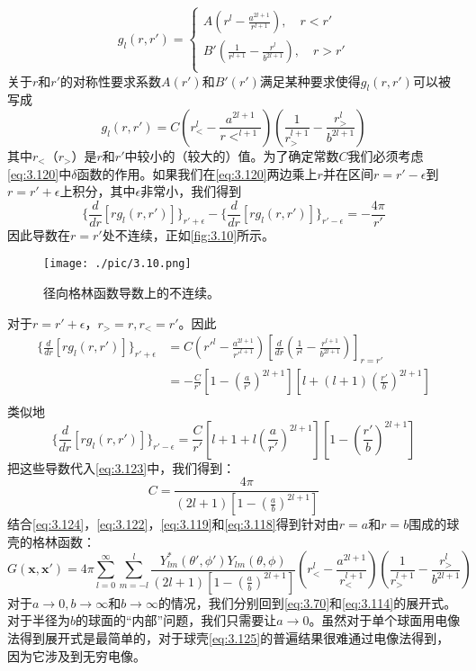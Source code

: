 \documentclass[12pt]{book}
\numberwithin{equation}{chapter}
\numberwithin{figure}{chapter}
\numberwithin{footnote}{page}
\begin{document}
\begin{equation}\label{eq:3.121}
    g_l(r,r')=
    \begin{cases}
        A(r^l-\frac{a^{2l+1}}{r^{l+1}}),\quad r<r'\\
        B'(\frac{1}{r^{l+1}}-\frac{r^l}{b^{2l+1}}),\quad r>r'\\
    \end{cases}
\end{equation}
关于$r$和$r'$的对称性要求系数$A(r')$和$B'(r')$满足某种要求使得$g_l(r,r')$可以被写成
\begin{equation}\label{eq:3.122}
    g_l(r,r')=C(r_<^l-\frac{a^{2l+1}}{r<^{l+1}})(\frac{1}{r_>^{l+1}}-\frac{r_>^l}{b^{2l+1}})
\end{equation}
其中$r_<$（$r_>$）是$r$和$r'$中较小的（较大的）值。为了确定常数$C$我们必须考虑\autoref{eq:3.120}中$\delta$函数的作用。如果我们在\autoref{eq:3.120}两边乘上$r$并在区间$r=r'-\epsilon$到$r=r'+\epsilon$上积分，其中$\epsilon$非常小，我们得到
\begin{equation}\label{eq:3.123}
    \{\frac{d}{dr}[rg_l(r,r')]\}_{r'+\epsilon}-\{\frac{d}{dr}[rg_l(r,r')]\}_{r'-\epsilon}=-\frac{4\pi}{r'}
\end{equation}
因此导数在$r=r'$处不连续，正如\autoref{fig:3.10}所示。

\begin{figure}[!ht]
    \centering
    \texttt{[image: ./pic/3.10.png]}
    \captionsetup{justification=raggedright, singlelinecheck=false}
    \caption{径向格林函数导数上的不连续。}
    \label{fig:3.10}
\end{figure}

对于$r=r'+\epsilon$，$r_>=r,r_<=r'$。因此
$$\begin{aligned}
    \{\frac{d}{dr}[rg_l(r,r')]\}_{r'+\epsilon}&=C(r'^l-\frac{a^{2l+1}}{r'^{l+1}})[\frac{d}{dr}(\frac{1}{r^l}-\frac{r^{l+1}}{b^{2l+1}})]_{r=r'}\\
    &=-\frac{C}{r'}[1-(\frac{a}{r'})^{2l+1}][l+(l+1)(\frac{r'}{b})^{2l+1}]\\
\end{aligned}$$
类似地
$$\{\frac{d}{dr}[rg_l(r,r')]\}_{r'-\epsilon}=\frac{C}{r'}[l+1+l(\frac{a}{r'})^{2l+1}][1-(\frac{r'}{b})^{2l+1}]$$
把这些导数代入\autoref{eq:3.123}中，我们得到：
\begin{equation}\label{eq:3.124}
    C=\frac{4\pi}{(2l+1)[1-(\frac{a}{b})^{2l+1}]}
\end{equation}
结合\autoref{eq:3.124}，\autoref{eq:3.122}，\autoref{eq:3.119}和\autoref{eq:3.118}得到针对由$r=a$和$r=b$围成的球壳的格林函数：
\begin{equation}\label{eq:3.125}
    G(\mathbf{x},\mathbf{x'})=4\pi\sum_{l=0}^\infty\sum_{m=-l}^l \frac{Y_{lm}^*(\theta',\phi')Y_{lm}(\theta,\phi)}{(2l+1)[1-(\frac{a}{b})^{2l+1}]}(r_<^l-\frac{a^{2l+1}}{r_<^{l+1}})(\frac{1}{r_>^{l+1}}-\frac{r_>^l}{b^{2l+1}})
\end{equation}
对于$a\to0,b\to\infty$和$b\to\infty$的情况，我们分别回到\autoref{eq:3.70}和\autoref{eq:3.114}的展开式。对于半径为$b$的球面的“内部”问题，我们只需要让$a\to0$。虽然对于单个球面用电像法得到展开式是最简单的，对于球壳\autoref{eq:3.125}的普遍结果很难通过电像法得到，因为它涉及到无穷电像。
\end{document}
